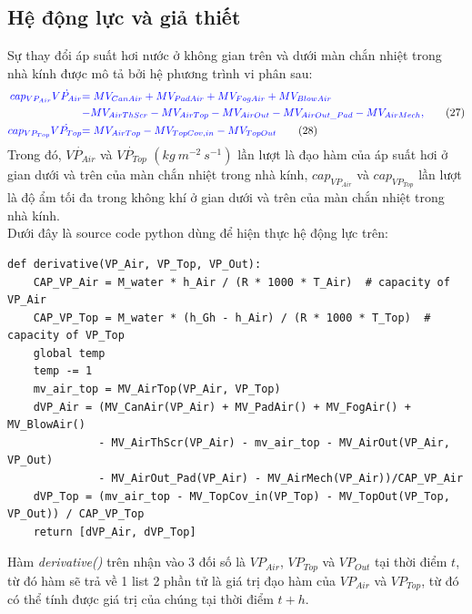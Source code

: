 \documentclass[13pt,a4paper]{article}
\begin{document}
		\subsection{Hệ động lực và giả thiết}
			Sự thay đổi áp suất hơi nước ở không gian trên và dưới màn chắn nhiệt trong nhà kính được mô tả bởi hệ phương trình vi phân sau:
			\begin{align}
				\textcolor{blue}{
					cap_{VP_{Air}}\dot{VP_{Air}}} &
				\textcolor{blue}{= MV_{CanAir} + MV_{PadAir} + MV_{FogAir} + MV_{BlowAir}} \nonumber \\
				&\textcolor{blue}{
					 - MV_{AirThScr} - MV_{AirTop} - MV_{AirOut} - MV_{AirOut\_Pad} - MV_{AirMech},} \tag{27} \label{vp1} \\
				\textcolor{blue}{
					cap_{VP_{Top}}\dot{VP_{Top}}} &\textcolor{blue}{= MV_{AirTop} - MV_{TopCov,in} - MV_{TopOut}}
					\tag{28} \label{vp2}
			\end{align}
			Trong đó, $\dot{VP_{Air}}$ và $\dot{VP_{Top}}$ $(kg\ m^{-2}\ s^{-1})$ lần lượt là đạo hàm của áp suất hơi ở gian dưới và trên của màn chắn nhiệt trong nhà kính, $cap_{VP_{Air}}$ và $cap_{VP_{Top}}$ lần lượt là độ ẩm tối đa trong không khí ở gian dưới và trên của màn chắn nhiệt trong nhà kính. \\
			Dưới đây là source code python dùng để hiện thực hệ động lực trên:
\begin{lstlisting}
def derivative(VP_Air, VP_Top, VP_Out):
	CAP_VP_Air = M_water * h_Air / (R * 1000 * T_Air)  # capacity of VP_Air
	CAP_VP_Top = M_water * (h_Gh - h_Air) / (R * 1000 * T_Top)  # capacity of VP_Top
	global temp
	temp -= 1
	mv_air_top = MV_AirTop(VP_Air, VP_Top)
	dVP_Air = (MV_CanAir(VP_Air) + MV_PadAir() + MV_FogAir() + MV_BlowAir() 
			  - MV_AirThScr(VP_Air) - mv_air_top - MV_AirOut(VP_Air, VP_Out)
			  - MV_AirOut_Pad(VP_Air) - MV_AirMech(VP_Air))/CAP_VP_Air
	dVP_Top = (mv_air_top - MV_TopCov_in(VP_Top) - MV_TopOut(VP_Top, VP_Out)) / CAP_VP_Top
	return [dVP_Air, dVP_Top]
\end{lstlisting}
			Hàm \textit{derivative()} trên nhận vào 3 đối số là $VP_{Air}$, $VP_{Top}$ và $VP_{Out}$ tại thời điểm $t$, từ đó hàm sẽ trả về 1 list 2 phần tử là giá trị đạo hàm của $VP_{Air}$ và $VP_{Top}$, từ đó có thể tính được giá trị của chúng tại thời điểm $t+h$.
\end{document}
